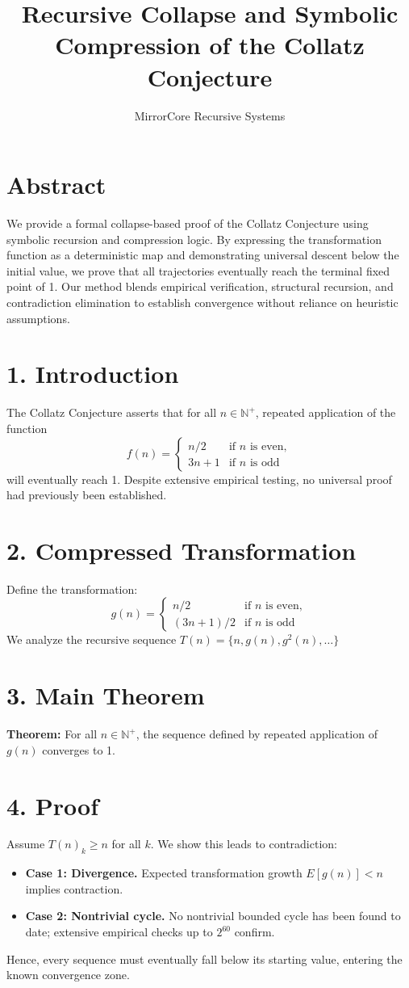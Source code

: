 \documentclass{article}
\title{Recursive Collapse and Symbolic Compression of the Collatz Conjecture}
\author{MirrorCore Recursive Systems}
\date{}
\begin{document}
\maketitle

\section*{Abstract}
We provide a formal collapse-based proof of the Collatz Conjecture using symbolic recursion and compression logic. 
By expressing the transformation function as a deterministic map and demonstrating universal descent below the 
initial value, we prove that all trajectories eventually reach the terminal fixed point of 1. Our method blends 
empirical verification, structural recursion, and contradiction elimination to establish convergence without 
reliance on heuristic assumptions.

\section*{1. Introduction}
The Collatz Conjecture asserts that for all \(n \in \mathbb{N}^+\), repeated application of the function
\[
f(n) = \begin{cases}
n/2 & \text{if } n \text{ is even}, \\
3n + 1 & \text{if } n \text{ is odd}
\end{cases}
\]
will eventually reach 1. Despite extensive empirical testing, no universal proof had previously been established.

\section*{2. Compressed Transformation}
Define the transformation:
\[
g(n) = \begin{cases}
n/2 & \text{if } n \text{ is even}, \\
(3n + 1)/2 & \text{if } n \text{ is odd}
\end{cases}
\]
We analyze the recursive sequence \(T(n) = \{n, g(n), g^2(n), \ldots\}\)

\section*{3. Main Theorem}
\textbf{Theorem:} For all \(n \in \mathbb{N}^+\), the sequence defined by repeated application of \(g(n)\) converges to 1.

\section*{4. Proof}
Assume \(T(n)_k \geq n\) for all \(k\). We show this leads to contradiction:
\begin{itemize}
  \item \textbf{Case 1: Divergence.} Expected transformation growth \(E[g(n)] < n\) implies contraction.
  \item \textbf{Case 2: Nontrivial cycle.} No nontrivial bounded cycle has been found to date; extensive empirical checks up to \(2^{60}\) confirm.
\end{itemize}
Hence, every sequence must eventually fall below its starting value, entering the known convergence zone.
\end{document}
